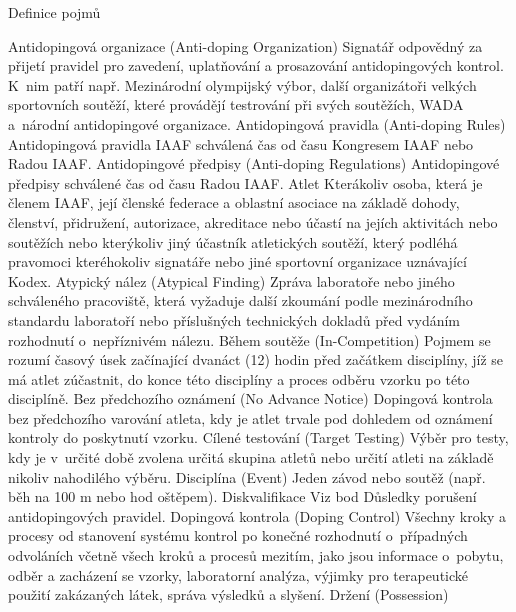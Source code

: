 \nonum\sec Definice pojmů

\dt Antidopingová organizace (Anti-doping Organization)
\dd Signatář odpovědný za přijetí pravidel pro zavedení, uplatňování a prosazování antidopingových kontrol. K~nim patří např. Mezinárodní olympijský výbor, další organizátoři velkých sportovních soutěží, které provádějí testrování při svých soutěžích, WADA a~národní antidopingové organizace.
\dend
\dt Antidopingová pravidla (Anti-doping Rules)
\dd Antidopingová pravidla IAAF schválená čas od času Kongresem IAAF nebo Radou IAAF.
\dend
\dt Antidopingové předpisy (Anti-doping Regulations)
\dd Antidopingové předpisy schválené čas od času Radou IAAF.
\dend
\dt Atlet
\dd Kterákoliv osoba, která je členem IAAF, její členské federace a oblastní asociace na základě dohody, členství, přidružení, autorizace, akreditace nebo účastí na jejích aktivitách nebo soutěžích nebo kterýkoliv jiný účastník atletických soutěží, který podléhá pravomoci kteréhokoliv signatáře nebo jiné sportovní organizace uznávající Kodex.
\dend
\dt Atypický nález (Atypical Finding)
\dd Zpráva laboratoře nebo jiného schváleného pracoviště, která vyžaduje další zkoumání podle mezinárodního standardu laboratoří nebo příslušných technických dokladů před vydáním rozhodnutí o~nepříznivém nálezu.
\dend
\dt Během soutěže (In-Competition)
\dd Pojmem  se rozumí časový úsek začínající dvanáct (12) hodin před začátkem disciplíny, jíž se má atlet zúčastnit, do konce této disciplíny a proces odběru vzorku po této disciplíně.
\dend
\dt Bez předchozího oznámení (No Advance Notice)
\dd Dopingová kontrola bez předchozího varování atleta, kdy je atlet trvale pod dohledem od oznámení kontroly do poskytnutí vzorku.
\dend
\dt Cílené testování (Target Testing)
\dd Výběr pro testy, kdy je v~určité době zvolena určitá skupina atletů nebo určití atleti na základě nikoliv nahodilého výběru.
\dend
\dt Disciplína (Event)
\dd Jeden závod nebo soutěž (např. běh na 100 m nebo hod oštěpem).
\dend
\dt Diskvalifikace
\dd Viz bod Důsledky porušení antidopingových pravidel.
\dend
\dt Dopingová kontrola (Doping Control)
\dd Všechny kroky a procesy od stanovení systému kontrol po konečné rozhodnutí o~případných odvoláních včetně všech kroků a procesů mezitím, jako jsou informace o~pobytu, odběr a zacházení se vzorky, laboratorní analýza, výjimky pro terapeutické použití zakázaných látek, správa výsledků a slyšení.
\dend
\dt Držení (Possession)

